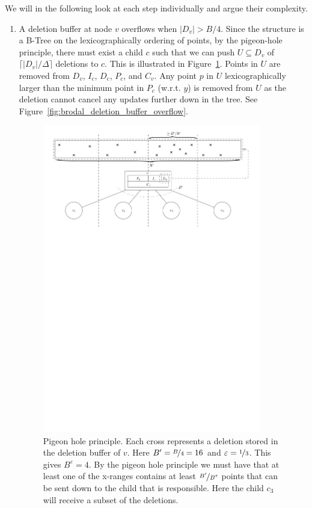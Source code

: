 \documentclass[twoside,11pt,openright]{report}
\def \epsilon {\varepsilon}
\begin{document}
We will in the following look at each step individually and argue their complexity.

\begin{enumerate}[label=(\roman*)]
	\item\label{update:del} A deletion buffer at node $v$ overflows when $\vert D_v \vert > B/4$. Since the structure is a B-Tree on the lexicographically ordering of points, by the pigeon-hole principle, there must exist a child $c$ such that we can push $U \subseteq D_v$ of $\lceil \vert D_v \vert / \Delta \rceil$ deletions to $c$. This is illustrated in Figure~\ref{fig:pigeon_hole}. Points in $U$ are removed from $D_v$, $I_c$, $D_c$, $P_c$, and $C_v$. Any point $p$ in $U$ lexicographically larger than the minimum point in $P_c$ (w.r.t. $y$) is removed from $U$ as the deletion cannot cancel any updates further down in the tree. See Figure~\ref{fig:brodal_deletion_buffer_overflow}.
	
	\begin{figure}[htp!]
		\centering
		\includegraphics[width=0.9\textwidth]{../figures/pigeon_hole2}
		\caption{Pigeon hole principle. Each cross represents a deletion stored in the deletion buffer of $v$. Here $B' = \nicefrac{B}{4} = 16$ and $\epsilon = \nicefrac{1}{3}$. This gives $B^{\epsilon} = 4$. By the pigeon hole principle we must have that at least one of the x-ranges contains at least $\nicefrac{B'}{B^{\epsilon}}$ points that can be sent down to the child that is responsible. Here the child $c_3$ will receive a subset of the deletions.}
		\label{fig:pigeon_hole}
	\end{figure}
	

\end{enumerate}
\end{document}
